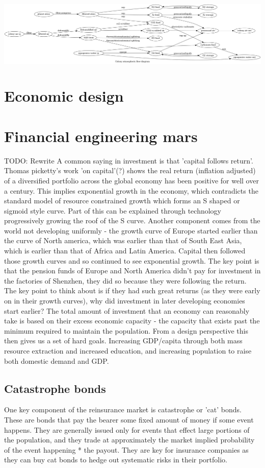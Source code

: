 \documentclass[10pt]{article}
\begin{document}
\includegraphics[width=1\textwidth]{fig_atmo.png}

\section*{Economic design}

\section{Financial engineering mars}

TODO: Rewrite
A common saying in investment is that 'capital follows return'. Thomas picketty's work 'on capital'(?) shows the real return (inflation adjusted) of a diversified portfolio across the global economy has been positive for well over a century. This implies exponential growth in the economy, which contradicts the standard model of resource constrained growth which forms an S shaped or sigmoid style curve. Part of this can be explained through technology progressively growing the roof of the S curve. Another component comes from the world not developing uniformly - the growth curve of Europe started earlier than the curve of North america, which was earlier than that of South East Asia, which is earlier than that of Africa and Latin America. Capital then followed those growth curves and so continued to see exponential growth. The key point is that the pension funds of Europe and North America didn't pay for investment in the factories of Shenzhen, they did so because they were following the return. The key point to think about is if they had such great returns (as they were early on in their growth curves), why did investment in later developing economies start earlier? The total amount of investment that an economy can reasonably take is based on their excess economic capacity - the capacity that exists past the minimum required to maintain the population. From a design perspective this then gives us a set of hard goals. Increasing GDP/capita through both mass resource extraction and increased education, and increasing population to raise both domestic demand and GDP.

\subsection{Catastrophe bonds}
One key component of the reinsurance market is catastrophe or 'cat' bonds. These are bonds that pay the bearer some fixed amount of money if some event happens. They are generally issued only for events that effect large portions of the population, and they trade at approximately the market implied probability of the event happening * the payout. They are key for insurance companies as they can buy cat bonds to hedge out systematic risks in their portfolio.
\end{document}
